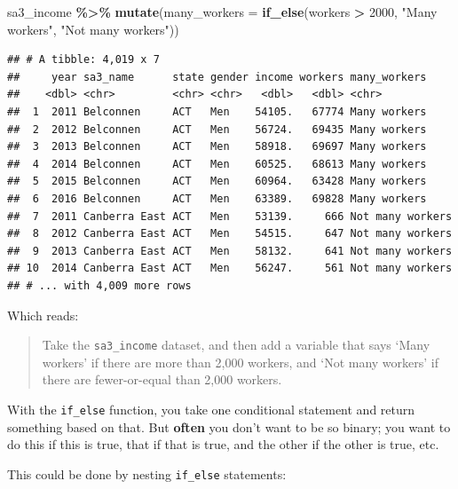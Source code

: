 \documentclass[
]{book}
\newenvironment{Shaded}{\begin{snugshade}}{\end{snugshade}}
\newcommand{\DataTypeTok}[1]{\textcolor[rgb]{0.13,0.29,0.53}{#1}}
\newcommand{\DecValTok}[1]{\textcolor[rgb]{0.00,0.00,0.81}{#1}}
\newcommand{\KeywordTok}[1]{\textcolor[rgb]{0.13,0.29,0.53}{\textbf{#1}}}
\newcommand{\NormalTok}[1]{#1}
\newcommand{\OperatorTok}[1]{\textcolor[rgb]{0.81,0.36,0.00}{\textbf{#1}}}
\newcommand{\StringTok}[1]{\textcolor[rgb]{0.31,0.60,0.02}{#1}}
\begin{document}
\begin{Shaded}
\begin{Highlighting}[]
\NormalTok{sa3\_income }\OperatorTok{\%\textgreater{}\%}\StringTok{ }
\StringTok{  }\KeywordTok{mutate}\NormalTok{(}\DataTypeTok{many\_workers =} \KeywordTok{if\_else}\NormalTok{(workers }\OperatorTok{\textgreater{}}\StringTok{ }\DecValTok{2000}\NormalTok{, }\StringTok{"Many workers"}\NormalTok{, }\StringTok{"Not many workers"}\NormalTok{))}
\end{Highlighting}
\end{Shaded}

\begin{verbatim}
## # A tibble: 4,019 x 7
##     year sa3_name      state gender income workers many_workers    
##    <dbl> <chr>         <chr> <chr>   <dbl>   <dbl> <chr>           
##  1  2011 Belconnen     ACT   Men    54105.   67774 Many workers    
##  2  2012 Belconnen     ACT   Men    56724.   69435 Many workers    
##  3  2013 Belconnen     ACT   Men    58918.   69697 Many workers    
##  4  2014 Belconnen     ACT   Men    60525.   68613 Many workers    
##  5  2015 Belconnen     ACT   Men    60964.   63428 Many workers    
##  6  2016 Belconnen     ACT   Men    63389.   69828 Many workers    
##  7  2011 Canberra East ACT   Men    53139.     666 Not many workers
##  8  2012 Canberra East ACT   Men    54515.     647 Not many workers
##  9  2013 Canberra East ACT   Men    58132.     641 Not many workers
## 10  2014 Canberra East ACT   Men    56247.     561 Not many workers
## # ... with 4,009 more rows
\end{verbatim}

Which reads:

\begin{quote}
Take the \texttt{sa3\_income} dataset, and then add a variable that says `Many workers' if there are more than 2,000 workers, and `Not many workers' if there are fewer-or-equal than 2,000 workers.
\end{quote}

With the \texttt{if\_else} function, you take one conditional statement and return something based on that. But \textbf{often} you don't want to be so binary; you want to do this if this is true, that if that is true, and the other if the other is true, etc.

This could be done by nesting \texttt{if\_else} statements:
\end{document}
